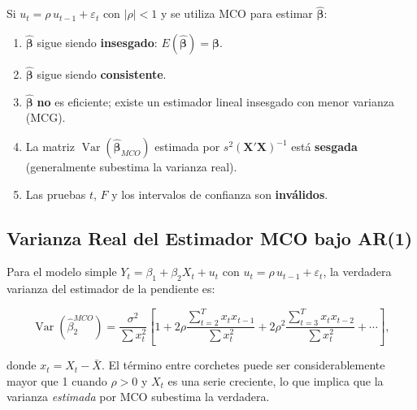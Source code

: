 \documentclass[12pt,a4paper]{article}
\theoremstyle{definition}
\theoremstyle{remark}
\begin{document}
\begin{teorema}
  Si $u_t = \rho\, u_{t-1} + \varepsilon_t$ con $|\rho|<1$ y se
  utiliza MCO para estimar $\boldsymbol{\hat\beta}$:
  \begin{enumerate}[label=\textbf{(\alph*)}, itemsep=4pt]
    \item $\boldsymbol{\hat\beta}$ sigue siendo \textbf{insesgado}:
          $E(\boldsymbol{\hat\beta}) = \boldsymbol{\beta}$.
    \item $\boldsymbol{\hat\beta}$ sigue siendo \textbf{consistente}.
    \item $\boldsymbol{\hat\beta}$ \textbf{no} es eficiente; existe un
          estimador lineal insesgado con menor varianza (MCG).
    \item La matriz $\operatorname{Var}(\boldsymbol{\hat\beta}_{MCO})$
          estimada por $s^2(\mathbf{X}'\mathbf{X})^{-1}$ está
          \textbf{sesgada} (generalmente subestima la varianza real).
    \item Las pruebas $t$, $F$ y los intervalos de confianza son
          \textbf{inválidos}.
  \end{enumerate}
\end{teorema}

\subsection{Varianza Real del Estimador MCO bajo AR(1)}

Para el modelo simple $Y_t = \beta_1 + \beta_2 X_t + u_t$ con
$u_t = \rho\, u_{t-1} + \varepsilon_t$, la verdadera varianza del
estimador de la pendiente es:

\begin{equation}
  \operatorname{Var}(\hat\beta_2^{MCO})
  = \frac{\sigma^2}{\sum x_t^2}
    \left[
      1 + 2\rho \frac{\sum_{t=2}^{T} x_t x_{t-1}}{\sum x_t^2}
        + 2\rho^2 \frac{\sum_{t=3}^{T} x_t x_{t-2}}{\sum x_t^2}
        + \cdots
    \right],
  \label{eq:var-real}
\end{equation}

donde $x_t = X_t - \bar{X}$. El término entre corchetes puede ser
considerablemente mayor que 1 cuando $\rho > 0$ y $X_t$ es una serie
creciente, lo que implica que la varianza \emph{estimada} por MCO
subestima la verdadera.

\end{document}
